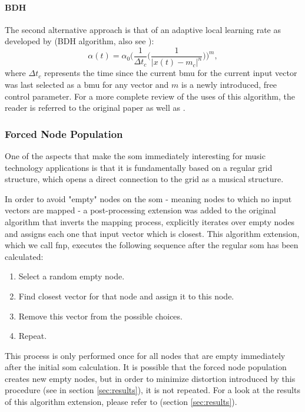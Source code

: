 \paragraph{BDH}
\label{para:alpha_bdh}
The second alternative approach is that of an adaptive local learning rate as
developed by \citet{bauer1996} (BDH algorithm, also see \citet{merenyi2007}):
\begin{equation}
  \alpha(t) = \alpha_0 \bigg(\frac{1}{\Delta{t_c}}\bigg(\frac{1}{|x(t)-m_c|^n}\bigg)\bigg)^m,
\end{equation}
where $\Delta{t_c}$ represents the time since the current \gls{bmu} for the
current input vector was last selected as a \gls{bmu} for any vector and $m$ is
a newly introduced, free control parameter. For a more complete review of the
uses of this algorithm, the reader is referred to the original paper
\citep{bauer1996} as well as \citet{merenyi2007}.

\subsubsection{Forced Node Population}
\label{subsubsec:som_forced_population}
One of the aspects that make the \gls{som} immediately interesting for music
technology applications is that it is fundamentally based on a regular grid
structure, which opens a direct connection to the grid as a musical structure.

In order to avoid "empty" nodes on the \gls{som} - meaning nodes to which no
input vectors are mapped - a post-processing extension was added to the original
algorithm that inverts the mapping process, explicitly iterates over empty nodes
and assigns each one that input vector which is closest. This algorithm
extension, which we call \gls{fnp}, executes the following
sequence after the regular \gls{som} has been calculated:

\begin{enumerate}
  \item Select a random empty node.
  \item Find closest vector for that node and assign it to this node.
  \item Remove this vector from the possible choices.
  \item Repeat.
\end{enumerate}

This process is only performed once for all nodes that are empty immediately
after the initial \gls{som} calculation. It is possible that the forced node
population creates new empty nodes, but in order to minimize distortion
introduced by this procedure
(see  in section \ref{sec:results}),
it is not repeated. For a look at the results of this algorithm extension,
please refer to
 (section \ref{sec:results}).

